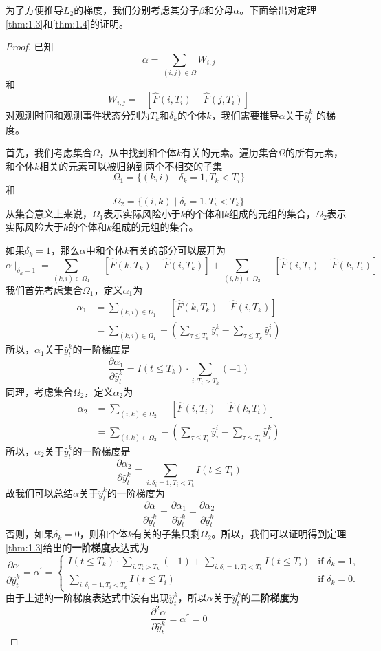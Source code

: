 为了方便推导$L_2$的梯度，我们分别考虑其分子$\beta$和分母$\alpha$。下面给出对定理\ref{thm:1.3}和\ref{thm:1.4}的证明。
\begin{proof}
已知$$\alpha = \sum_{(i,j)\in \Omega} W_{i,j}$$ 和 $$W_{i,j} = -\left[ \hat{F}(i, T_i) - \hat{F}(j, T_i) \right]$$ 对观测时间和观测事件状态分别为$T_k$和$\delta_k$的个体$k$，我们需要推导$\alpha$关于$\hat{y}_t^k$ 的梯度。

首先，我们考虑集合$\Omega$，从中找到和个体$k$有关的元素。遍历集合$\Omega$的所有元素，和个体$k$相关的元素可以被归纳到两个不相交的子集$$\Omega_1=\{(k,i) \mid \delta_k=1,T_k < T_i\}$$ 和 $$\Omega_2=\{(i,k) \mid \delta_i=1,T_i < T_k\}$$ 从集合意义上来说，$\Omega_1$表示实际风险小于$k$的个体和$k$组成的元组的集合，$\Omega_2$表示实际风险大于$k$的个体和$k$组成的元组的集合。

如果$\delta_k = 1$，那么$\alpha$中和个体$k$有关的部分可以展开为$$\alpha \mid_{\delta_k=1}=\sum_{(k,i)\in \Omega_1} -\left[ \hat{F}(k, T_k) - \hat{F}(i, T_k) \right] + \sum_{(i,k)\in \Omega_2} -\left[ \hat{F}(i, T_i) - \hat{F}(k, T_i) \right] $$ 我们首先考虑集合$\Omega_1$，定义$\alpha_1$为\[
\begin{split}
\alpha_1 &= \sum_{(k,i)\in \Omega_1} -\left[ \hat{F}(k, T_k) - \hat{F}(i, T_k) \right] \\
         &= \sum_{(k,i)\in \Omega_1} - ( \sum_{\tau \le T_k} \hat{y}_{\tau}^k - \sum_{\tau \le T_k} \hat{y}_{\tau}^i )
\end{split}
\] 所以，$\alpha_1$关于$\hat{y}_t^k$的一阶梯度是$$\frac{\partial \alpha_1}{\partial \hat{y}_t^k} = I(t\le T_k)\cdot {\sum\limits_{i: T_i>T_k}(-1)}$$ 同理，考虑集合$\Omega_2$，定义$\alpha_2$为\[
\begin{split}
\alpha_2 &= \sum_{(i,k)\in \Omega_2} -\left[ \hat{F}(i, T_i) - \hat{F}(k, T_i) \right] \\
         &= \sum_{(i,k)\in \Omega_2} - ( \sum_{\tau \le T_i} \hat{y}_{\tau}^i - \sum_{\tau \le T_i} \hat{y}_{\tau}^k )
\end{split}
\] 所以，$\alpha_2$关于$\hat{y}_t^k$的一阶梯度是$$\frac{\partial \alpha_2}{\partial \hat{y}_t^k} = \sum\limits_{i: \delta_i=1,T_i<T_k} I(t\le T_i)$$ 故我们可以总结$\alpha$关于$\hat{y}_t^k$的一阶梯度为$$\frac{\partial \alpha}{\partial \hat{y}_t^k} = \frac{\partial \alpha_1}{\partial \hat{y}_t^k} + \frac{\partial \alpha_2}{\partial \hat{y}_t^k}$$ 否则，如果$\delta_k = 0$，则和个体$k$有关的子集只剩$\Omega_2$。所以，我们可以证明得到定理\ref{thm:1.3}给出的\textbf{一阶梯度}表达式为$$
\frac{\partial \alpha}{\partial \hat{y}_t^k}=\alpha^{'}=
\begin{cases}
I(t\le T_k)\cdot {\sum\limits_{i: T_i>T_k}(-1)} + \sum\limits_{i: \delta_i=1,T_i<T_k} I(t\le T_i) & \text{if } \delta_k = 1,\\
\sum\limits_{i: \delta_i=1,T_i<T_k} I(t\le T_i) & \text{if } \delta_k = 0.
\end{cases}
$$ 由于上述的一阶梯度表达式中没有出现$\hat{y}_t^k$，所以$\alpha$关于$\hat{y}_t^k$的\textbf{二阶梯度}为$$
\frac{\partial^2 \alpha}{\partial \hat{y}_t^k}=\alpha^{''}=0
$$


\end{proof}
